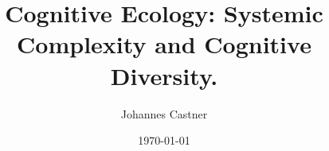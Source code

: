 \documentclass{beamer}
\date{\today}
\begin{document}
\title{Cognitive Ecology: Systemic Complexity and Cognitive Diversity.}



\author{Johannes Castner}
\begin{frame}
\titlepage


\end{frame}

\end{document}
